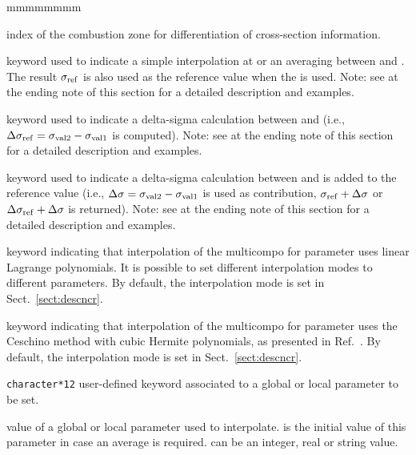 \begin{ListeDeDescription}{mmmmmmmm}
\item[\dusa{ivarty}] index of the combustion zone for differentiation of cross-section information.

\item[\moc{SET}] keyword used to indicate a simple interpolation at  or an averaging between  and . The result $\sigma_{\rm ref}$ is also used as the reference value when the  is used. Note: see at the ending note of this section for a detailed description and examples.

\item[\moc{DELTA}] keyword used to indicate a delta-sigma calculation between  and 
(i.e., $\Delta\sigma_{\rm ref}=\sigma_{\rm val2}-\sigma_{\rm val1}$ is computed). Note: see at the ending note of this section for a detailed description and examples.

\item[\moc{ADD}] keyword used to indicate a delta-sigma calculation between  and  is added to the reference value
(i.e., $\Delta\sigma=\sigma_{\rm val2}-\sigma_{\rm val1}$ is used as contribution, $\sigma_{\rm ref}+\Delta\sigma$ or $\Delta\sigma_{\rm ref}+\Delta\sigma$ is returned). Note: see at the ending note of this section for a detailed description and examples.

\item[\moc{LINEAR}] keyword indicating that interpolation of the {\sc multicompo} for parameter  uses linear Lagrange
polynomials. It is possible to set different interpolation modes to different parameters. By default, the interpolation mode is set in Sect.~\ref{sect:descncr}.

\item[\moc{CUBIC}] keyword indicating that interpolation of the {\sc multicompo} for parameter  uses the Ceschino method
with cubic Hermite polynomials, as presented in Ref.~. By default, the interpolation mode is set in Sect.~\ref{sect:descncr}.

\item[\dusa{PARKEY}] {\tt character*12} user-defined keyword associated to a global
or local parameter to be set.

\item[\dusa{val1}] value of a global or local parameter used to interpolate.   is the initial value of this parameter in case an average is required.  can be an integer, real or string value.


\end{ListeDeDescription}
